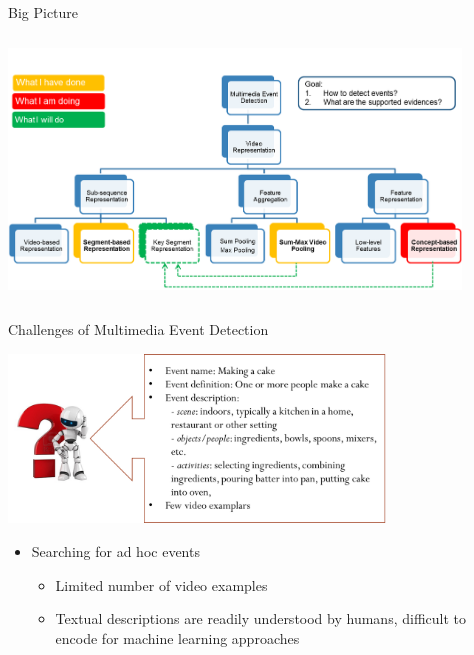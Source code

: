 \documentclass{beamer}
\begin{document}
\begin{frame}[t]{Big Picture}
\begin{center}
\includegraphics[width=12cm,height=7cm]{images/bigpicture.png}
\end{center}

\end{frame}

\begin{frame}[t]{Challenges of Multimedia Event Detection}
\begin{center}
\includegraphics[width=10cm,height=4.5cm]{images/challenge3.png}
\end{center}

\begin{itemize}
\item Searching for ad hoc events 
\begin{itemize}
\item Limited number of video examples
\item Textual descriptions are readily understood by humans, difficult to encode for machine learning approaches
\end{itemize}

\end{itemize}

\end{frame}
\end{document}
